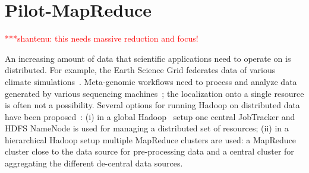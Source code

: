 \documentclass[]{paper}
\newcommand{\jhanote}[1]{ {\textcolor{red} { ***shantenu: #1 }}}
\newcommand{\jhanote}[1]{}
\begin{document}

\section{Pilot-MapReduce}

\jhanote{this needs massive reduction and focus!}




An increasing amount of data that scientific applications need to operate on is distributed. For example, the Earth Science Grid federates data of various climate simulations~\cite{ESG}. Meta-genomic workflows need to process and analyze data generated by various sequencing machines~\cite{Jha:2011fk}; the localization onto a single resource is often not a possibility.
Several options for running Hadoop on distributed data have been proposed~\cite{weissman-mr-11}: (i) in a global Hadoop~\cite{hadoop} setup one central JobTracker and HDFS NameNode is used for managing a distributed set of resources; (ii) in a hierarchical Hadoop setup multiple MapReduce clusters are used: a MapReduce cluster close to the data source for pre-processing data and a central cluster for aggregating the different de-central data sources.
\end{document}
